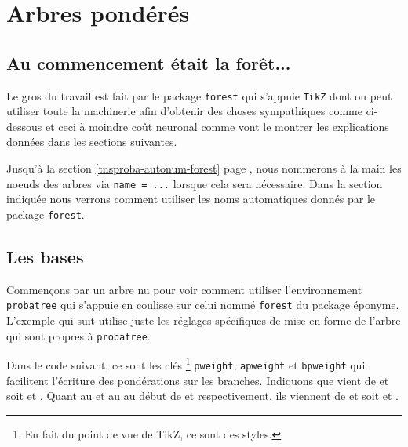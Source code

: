 \documentclass[12pt,a4paper]{article}
\begin{document}
\section{Arbres pondérés}

\subsection{Au commencement était la forêt...}

Le gros du travail est fait par le package \verb+forest+ qui s'appuie \verb+TikZ+ dont on peut utiliser toute la machinerie afin d'obtenir des choses sympathiques comme ci-dessous et ceci à moindre coût neuronal comme vont le montrer les explications données dans les sections suivantes.



\begin{remark}
	Jusqu'à la section \ref{tnsproba-autonum-forest} page \pageref{tnsproba-autonum-forest}, nous nommerons à la main les noeuds des arbres via \verb#name = ...# lorsque cela sera nécessaire.
	Dans la section indiquée nous verrons comment utiliser les noms automatiques donnés par le package \verb#forest#.
\end{remark}





\subsection{Les bases}


Commençons par un arbre nu pour voir comment utiliser l'environnement \verb+probatree+ qui s'appuie en coulisse sur celui nommé \verb+forest+ du package éponyme.
L'exemple qui suit utilise juste les réglages spécifiques de mise en forme de l'arbre qui sont propres à \verb+probatree+.






Dans le code suivant, ce sont les clés
\footnote{
	En fait du point de vue de TikZ, ce sont des styles.
}
\verb+pweight+, \verb+apweight+ et \verb+bpweight+ qui facilitent l'écriture des pondérations sur les branches.
Indiquons que  vient de  et  soit  et .
Quant au  et au  au début de  et  respectivement, ils viennent de  et  soit  et .
\end{document}
